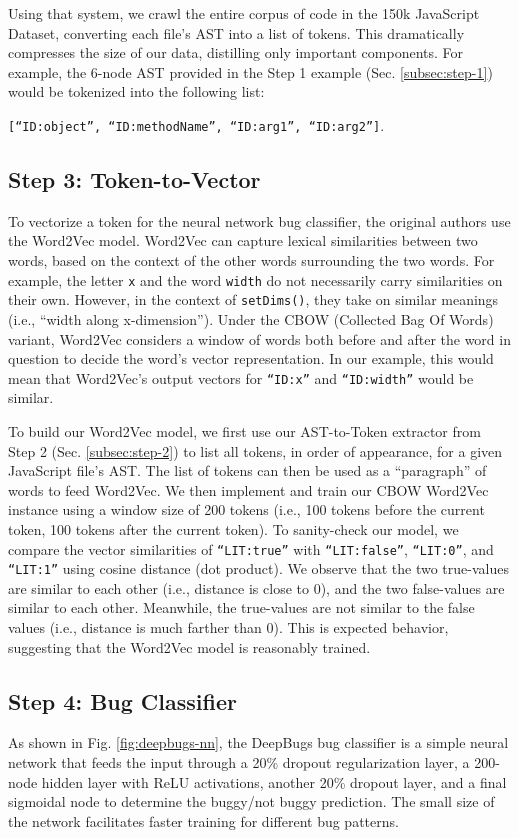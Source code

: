 Using that system, we crawl the entire corpus of code in the 150k JavaScript Dataset, converting each file's AST into a list of tokens. This dramatically compresses the size of our data, distilling only important components. For example, the 6-node AST provided in the Step 1 example (Sec. \ref{subsec:step-1}) would be tokenized into the following list:

\small
\texttt{[``ID:object'', ``ID:methodName'', ``ID:arg1'', ``ID:arg2'']}.
\normalsize

\subsection{Step 3: Token-to-Vector}
\label{subsec:step-3}
To vectorize a token for the neural network bug classifier, the original authors use the Word2Vec \cite{mikolov_efficient_2013} model. Word2Vec can capture lexical similarities between two words, based on the context of the other words surrounding the two words. For example, the letter \texttt{x} and the word \texttt{width} do not necessarily carry similarities on their own. However, in the context of \texttt{setDims()}, they take on similar meanings (i.e., ``width along x-dimension''). Under the CBOW (Collected Bag Of Words) variant, Word2Vec considers a window of words both before and after the word in question to decide the word's vector representation. In our example, this would mean that Word2Vec's output vectors for \texttt{``ID:x''} and \texttt{``ID:width''} would be similar.

To build our Word2Vec model, we first use our AST-to-Token extractor from Step 2 (Sec. \ref{subsec:step-2}) to list all tokens, in order of appearance, for a given JavaScript file's AST. The list of tokens can then be used as a ``paragraph'' of words to feed Word2Vec. We then implement and train our CBOW Word2Vec instance using a window size of 200 tokens (i.e., 100 tokens before the current token, 100 tokens after the current token). To sanity-check our model, we compare the vector similarities of  \texttt{``LIT:true''} with \texttt{``LIT:false''}, \texttt{``LIT:0''}, and \texttt{``LIT:1''} using cosine distance (dot product). We observe that the two true-values are similar to each other (i.e., distance is close to 0), and the two false-values are similar to each other. Meanwhile, the true-values are not similar to the false values (i.e., distance is much farther than 0). This is expected behavior, suggesting that the Word2Vec model is reasonably trained.

\subsection{Step 4: Bug Classifier}
\label{subsec:step-4}
As shown in Fig. \ref{fig:deepbugs-nn}, the DeepBugs bug classifier is a simple neural network that feeds the input through a 20\% dropout regularization layer, a 200-node hidden layer with ReLU activations, another 20\% dropout layer, and a final sigmoidal node to determine the buggy/not buggy prediction. The small size of the network facilitates faster training for different bug patterns.

